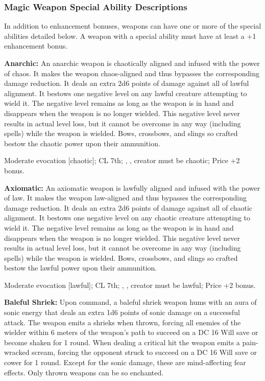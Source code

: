 \subsubsection{Magic Weapon Special Ability Descriptions}
In addition to enhancement bonuses, weapons can have one or more of the special abilities detailed below. A weapon with a special ability must have at least a +1 enhancement bonus.

\textbf{Anarchic:} An anarchic weapon is chaotically aligned and infused with the power of chaos. It makes the weapon chaos-aligned and thus bypasses the corresponding damage reduction. It deals an extra 2d6 points of damage against all of lawful alignment. It bestows one negative level on any lawful creature attempting to wield it. The negative level remains as long as the weapon is in hand and disappears when the weapon is no longer wielded. This negative level never results in actual level loss, but it cannot be overcome in any way (including  spells) while the weapon is wielded. Bows, crossbows, and slings so crafted bestow the chaotic power upon their ammunition.

Moderate evocation [chaotic]; CL 7th; , , creator must be chaotic; Price +2 bonus.

\textbf{Axiomatic:} An axiomatic weapon is lawfully aligned and infused with the power of law. It makes the weapon law-aligned and thus bypasses the corresponding damage reduction. It deals an extra 2d6 points of damage against all of chaotic alignment. It bestows one negative level on any chaotic creature attempting to wield it. The negative level remains as long as the weapon is in hand and disappears when the weapon is no longer wielded. This negative level never results in actual level loss, but it cannot be overcome in any way (including  spells) while the weapon is wielded. Bows, crossbows, and slings so crafted bestow the lawful power upon their ammunition.

Moderate evocation [lawful]; CL 7th; , , creator must be lawful; Price +2 bonus.

\textbf{Baleful Shriek:} Upon command, a baleful shriek weapon hums with an aura of sonic energy that deals an extra 1d6 points of sonic damage on a successful attack. The weapon emits a shrieks when thrown, forcing all enemies of the wielder within 6 meters of the weapon's path to succeed on a DC 16 Will save or become shaken for 1 round. When dealing a critical hit the weapon emits a pain-wracked scream, forcing the opponent struck to succeed on a DC 16 Will save or cower for 1 round. Except for the sonic damage, these are mind-affecting fear effects. Only thrown weapons can be so enchanted.

